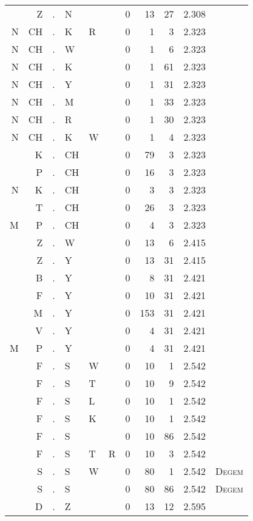 \begin{longtable}{r@{ } r@{ } c@{ } l@{ } l@{ } l@{ } r r r r l }
  & Z & . & N &   &   & 0 & 13 & 27 & 2.308 &  \\
N & CH & . & K & R &   & 0 & 1 & 3 & 2.323 &  \\
N & CH & . & W &   &   & 0 & 1 & 6 & 2.323 &  \\
N & CH & . & K &   &   & 0 & 1 & 61 & 2.323 &  \\
N & CH & . & Y &   &   & 0 & 1 & 31 & 2.323 &  \\
N & CH & . & M &   &   & 0 & 1 & 33 & 2.323 &  \\
N & CH & . & R &   &   & 0 & 1 & 30 & 2.323 &  \\
N & CH & . & K & W &   & 0 & 1 & 4 & 2.323 &  \\
  & K & . & CH &   &   & 0 & 79 & 3 & 2.323 &  \\
  & P & . & CH &   &   & 0 & 16 & 3 & 2.323 &  \\
N & K & . & CH &   &   & 0 & 3 & 3 & 2.323 &  \\
  & T & . & CH &   &   & 0 & 26 & 3 & 2.323 &  \\
M & P & . & CH &   &   & 0 & 4 & 3 & 2.323 &  \\
  & Z & . & W &   &   & 0 & 13 & 6 & 2.415 &  \\
  & Z & . & Y &   &   & 0 & 13 & 31 & 2.415 &  \\
  & B & . & Y &   &   & 0 & 8 & 31 & 2.421 &  \\
  & F & . & Y &   &   & 0 & 10 & 31 & 2.421 &  \\
  & M & . & Y &   &   & 0 & 153 & 31 & 2.421 &  \\
  & V & . & Y &   &   & 0 & 4 & 31 & 2.421 &  \\
M & P & . & Y &   &   & 0 & 4 & 31 & 2.421 &  \\
  & F & . & S & W &   & 0 & 10 & 1 & 2.542 &  \\
  & F & . & S & T &   & 0 & 10 & 9 & 2.542 &  \\
  & F & . & S & L &   & 0 & 10 & 1 & 2.542 &  \\
  & F & . & S & K &   & 0 & 10 & 1 & 2.542 &  \\
  & F & . & S &   &   & 0 & 10 & 86 & 2.542 &  \\
  & F & . & S & T & R & 0 & 10 & 3 & 2.542 &  \\
  & S & . & S & W &   & 0 & 80 & 1 & 2.542 & \textsc{Degem} \\
  & S & . & S &   &   & 0 & 80 & 86 & 2.542 & \textsc{Degem} \\
  & D & . & Z &   &   & 0 & 13 & 12 & 2.595 &  \\

\end{longtable}
